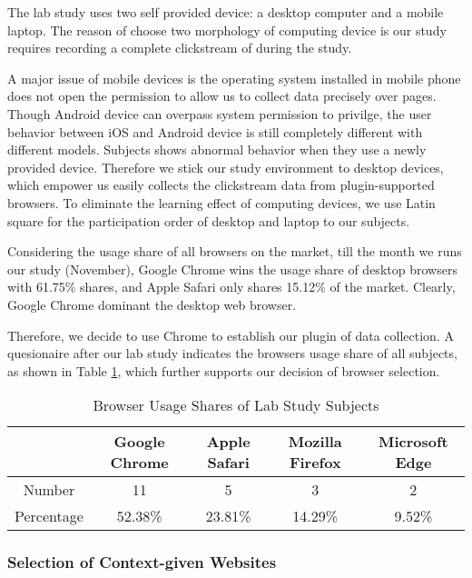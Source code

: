 The lab study uses two self provided device: a desktop computer and a mobile laptop.
The reason of choose two morphology of computing device is our study requires recording
a complete clickstream of during the study.

A major issue of mobile devices is the operating system installed in mobile phone does not
open the permission to allow us to collect data precisely over pages. Though Android device
can overpass system permission to privilge, the user behavior between iOS and Android device
is still completely different with different models. Subjects shows abnormal behavior when they
use a newly provided device. Therefore we stick our study environment to desktop devices, 
which empower us easily collects the clickstream data from plugin-supported browsers.
To eliminate the learning effect of computing devices, we use Latin square \cite{cochran1950experimental} 
for the participation order of desktop and laptop to our subjects.

Considering the usage share of all browsers on the market, till the month we runs our study (November),
Google Chrome wins the usage share of desktop browsers with 61.75\% shares, and Apple Safari only shares
15.12\% of the market. Clearly, Google Chrome dominant the desktop web browser. 

Therefore, we decide to use Chrome to establish our plugin of data collection.
A quesionaire after our lab study indicates the browsers usage share of all subjects, 
as shown in Table \ref{table:sharesubjects}, which further supports our decision of 
browser selection.

\begin{table}[H]
    \small
    \centering
    \setlength{\belowcaptionskip}{10pt}
    \caption{Browser Usage Shares of Lab Study Subjects}
    \begin{tabular}{ccccc}
          \toprule
        & \textbf{Google Chrome} & \textbf{Apple Safari} & \textbf{Mozilla Firefox} & \textbf{Microsoft Edge} \\
          \hline
          Number     & 11 & 5 & 3 & 2 \\
          Percentage & 52.38\% & 23.81\% & 14.29\% & 9.52\% \\
          \bottomrule
    \end{tabular}
    \label{table:sharesubjects}
\end{table}

\subsubsection{Selection of Context-given Websites}

